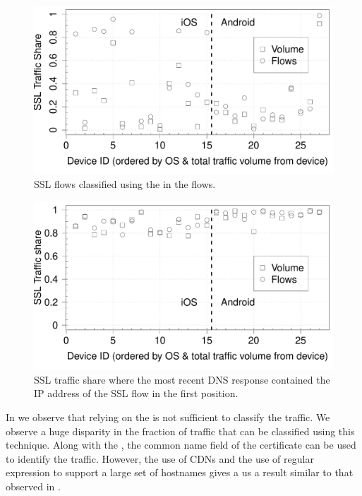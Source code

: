 \begin{figure}[t]
\includegraphics[width=\columnwidth]{plots/sslanalysis_someservername_traffic.pdf}
\caption{SSL flows classified using the \sslservername in the flows.}
\label{fig:ssl-classification-servername}
\end{figure}
\begin{figure}[t]
\includegraphics[width=\columnwidth]{plots/sslanalysis_samedns_traffic.pdf}
\caption{SSL traffic share where the most recent DNS response contained the IP address of the SSL flow in the first position.}
\label{fig:ssl-classification-app-service}
\end{figure}


In  we observe that relying on the \sslservername is not sufficient to classify the traffic. 
We observe a huge disparity in the fraction of traffic that can be classified using this technique.
Along with the \sslservername, the common name field of the certificate can be used to identify the traffic. 
However, the use of CDNs and the use of regular expression to support a large set of hostnames gives a us a result similar to that observed in .

